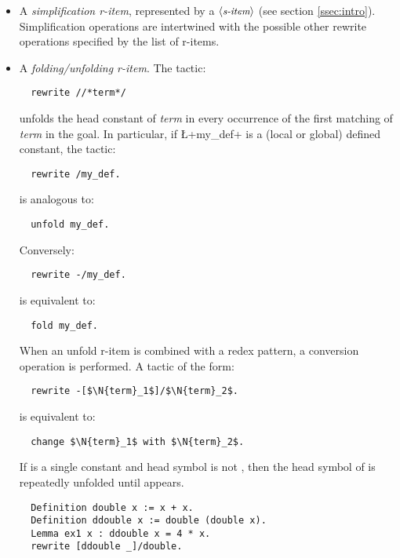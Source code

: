 \begin{itemize}
\item A \emph{simplification r-item}, represented by a
  $\langle\mbox{\itshape\rmfamily\small s-item}\rangle$ (see section \ref{ssec:intro}).
  Simplification operations are
  intertwined with the possible other rewrite operations specified by
  the list of r-items.
\item A \emph{folding/unfolding r-item}. The tactic:
\begin{lstlisting}
  rewrite //*term*/
\end{lstlisting}
unfolds the head constant of \textit{term} in every occurrence of the
first matching of \textit{term} in the goal. In particular, if
\L+my_def+ is a (local or global) defined constant, the tactic:
\begin{lstlisting}
  rewrite /my_def.
\end{lstlisting}
is analogous to: 
\begin{lstlisting}
  unfold my_def.
\end{lstlisting}
Conversely:
\begin{lstlisting}
  rewrite -/my_def.
\end{lstlisting}
is equivalent to:
\begin{lstlisting}
  fold my_def.
\end{lstlisting}

When an unfold r-item is combined with a redex pattern, a conversion
operation is performed. A tactic of the form:
\begin{lstlisting}
  rewrite -[$\N{term}_1$]/$\N{term}_2$.
\end{lstlisting}
is equivalent to:
\begin{lstlisting}
  change $\N{term}_1$ with $\N{term}_2$.
\end{lstlisting}

If  is a single constant and  head symbol
is not , then the head symbol of  is
repeatedly unfolded until  appears.

\begin{lstlisting}
  Definition double x := x + x.
  Definition ddouble x := double (double x).
  Lemma ex1 x : ddouble x = 4 * x.
  rewrite [ddouble _]/double.
\end{lstlisting}


\end{itemize}
